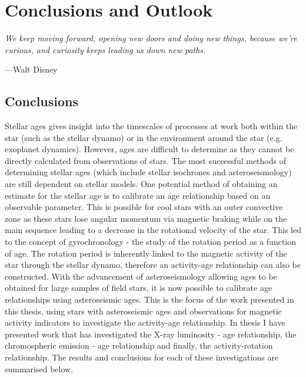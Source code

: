
\chapter{Conclusions and Outlook} %

\label{Chapter6} %


\epigraph{\itshape We keep moving forward, opening new doors and doing new things, because we're curious, and curiosity keeps leading us down new paths.}{---Walt Disney}

\section{Conclusions}

Stellar ages gives insight into the timescales of processes at work both within the star (such as the stellar dynamo) or in the environment around the star (e.g. exoplanet dynamics). However, ages are difficult to determine as they cannot be directly calculated from observations of stars. The most successful methods of determining stellar ages (which include stellar isochrones and asteroseismology) are still dependent on stellar models. One potential method of obtaining an estimate for the stellar age is to calibrate an age relationship based on an observable parameter. This is possible for cool stars with an outer convective zone as these stars lose angular momentum via magnetic braking while on the main sequence leading to a decrease in the rotational velocity of the star. This led to the concept of gyrochronology - the study of the rotation period as a function of age. The rotation period is inherently linked to the magnetic activity of the star through the stellar dynamo, therefore an activity-age relationship can also be constructed. With the advancement of asteroseismology allowing ages to be obtained for large samples of field stars, it is now possible to calibrate age relationships using asteroseismic ages. This is the focus of the work presented in this thesis, using stars with asteroseismic ages and observations for magnetic activity indicators to investigate the activity-age relationship. In thesis I have presented work that has investigated the X-ray luminosity - age relationship, the chromospheric emission - age relationship and finally, the activity-rotation relationship. The results and conclusions for each of these investigations are summarised below.

